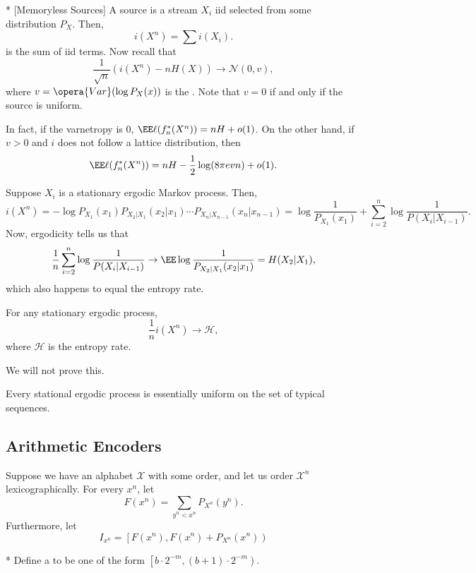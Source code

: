 \begin{exm}*
	[Memoryless Sources]
	A  source is a stream $X_i$ iid selected from some distribution $P_X$. Then, \[
		i(X^n) = \sum i(X_i).
	\]
	is the sum of iid terms. Now recall that \[
		\frac 1{\sqrt n} (i(X^n) - nH(X)) \to \mathcal N(0,v),
	\]where $v = \opera{Var}(\log P_X(x))$ is the . Note that $v = 0$ if and only if the source is uniform.
\end{exm}

\begin{fact}
	In fact, if the varnetropy is $0$, $\EE\ell(f_n^*(X^n)) = nH + o(1)$. On the other hand, if $v > 0$ and $i$ does not follow a lattice distribution, then \[
		\EE\ell(f_n^*(X^n)) = nH - \frac 12 \log(8\pi evn) + o(1).
	\]
\end{fact}

\begin{exm}
	Suppose $X_i$ is a stationary ergodic Markov process. Then, \[
		i(X^n) = -\log P_{X_1}(x_1) P_{X_2|X_1}(x_2|x_1) \cdots P_{X_n|X_{n-1}} (x_n|x_{n-1}) = \log \frac{1}{P_{X_1}(x_1)} + \sum_{i=2}^n \log \frac{1}{P(X_i|X_{i-1})}.
	\]
	Now, ergodicity tells us that \[
		\frac 1n \sum_{i=2}^n \log \frac{1}{P(X_i|X_{i-1})} \to \EE \log \frac{1}{P_{X_2|X_1} (x_2|x_1)} = H(X_2|X_1),
	\]
	which also happens to equal the entropy rate.
\end{exm}

\begin{thm}
	For any stationary ergodic process, \[
		\frac 1n i(X^n) \to \mathcal H,
	\]
	where $\mathcal H$ is the entropy rate.
\end{thm}

We will not prove this.

\begin{cor}
	Every stational ergodic process is essentially uniform on the set of typical sequences.
\end{cor}	

\subsection{Arithmetic Encoders}

Suppose we have an alphabet $\mathcal X$ with some order, and let us order $\mathcal X^n$ lexicographically. For every $x^n$, let \[
	F(x^n) = \sum_{y^n < x^n} P_{X^n}(y^n).
\]Furthermore, let \[
	I_{x^n} = \left[F(x^n), F(x^n) + P_{X^n}(x^n) \right)
\]

\begin{defn}*
	Define a  to be one of the form $\left[b \cdot 2^{-m}, (b+1)\cdot 2^{-m}\right)$.
\end{defn}

